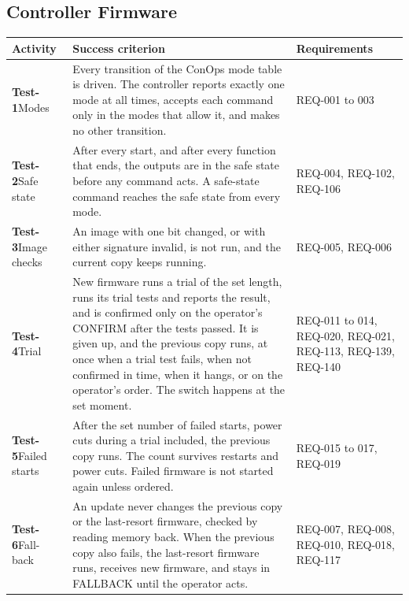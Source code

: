 \documentclass[11pt,a4paper]{article}
\begin{document}
\subsection{Controller Firmware}
{\footnotesize
\begin{xltabular}{\textwidth}{@{}>{\raggedright\arraybackslash}p{3.0cm}>{\raggedright\arraybackslash}X>{\raggedright\arraybackslash}p{2.4cm}@{}}
\toprule
Activity & Success criterion & Requirements \\
\midrule
\endhead
\textbf{Test-1}\newline Modes & Every transition of the ConOps mode table is driven. The controller reports exactly one mode at all times, accepts each command only in the modes that allow it, and makes no other transition. & REQ-001 to 003 \\
\textbf{Test-2}\newline Safe state & After every start, and after every function that ends, the outputs are in the safe state before any command acts. A safe-state command reaches the safe state from every mode. & REQ-004, REQ-102, REQ-106 \\
\textbf{Test-3}\newline Image checks & An image with one bit changed, or with either signature invalid, is not run, and the current copy keeps running. & REQ-005, REQ-006 \\
\textbf{Test-4}\newline Trial & New firmware runs a trial of the set length, runs its trial tests and reports the result, and is confirmed only on the operator's CONFIRM after the tests passed. It is given up, and the previous copy runs, at once when a trial test fails, when not confirmed in time, when it hangs, or on the operator's order. The switch happens at the set moment. & REQ-011 to 014, REQ-020, REQ-021, REQ-113, REQ-139, REQ-140 \\
\textbf{Test-5}\newline Failed starts & After the set number of failed starts, power cuts during a trial included, the previous copy runs. The count survives restarts and power cuts. Failed firmware is not started again unless ordered. & REQ-015 to 017, REQ-019 \\
\textbf{Test-6}\newline Fall-back & An update never changes the previous copy or the last-resort firmware, checked by reading memory back. When the previous copy also fails, the last-resort firmware runs, receives new firmware, and stays in FALLBACK until the operator acts. & REQ-007, REQ-008, REQ-010, REQ-018, REQ-117 \\

\end{xltabular}}
\end{document}

